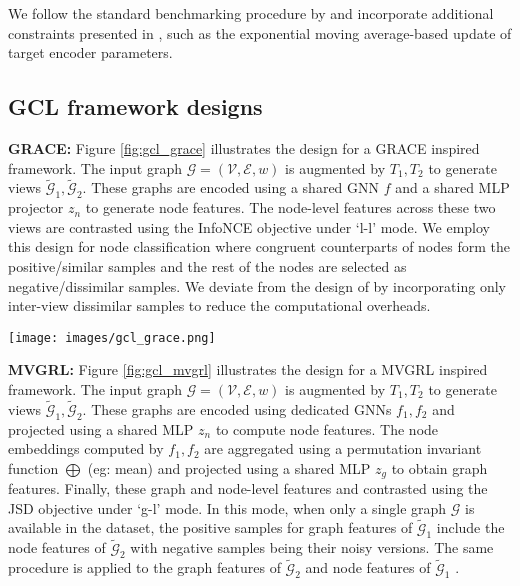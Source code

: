 \documentclass{article}
\def\gE{{\mathcal{E}}}
\def\gG{{\mathcal{G}}}
\def\gV{{\mathcal{V}}}
\theoremstyle{plain}
\theoremstyle{definition}
\theoremstyle{remark}
\begin{document}
We follow the standard benchmarking procedure by \citet{zhu2021empirical} and incorporate additional constraints presented in  \citet{thakoor2021bootstrapped}, such as the exponential moving average-based update of target encoder parameters.

\subsection{GCL framework designs}

\textbf{GRACE:} Figure \ref{fig:gcl_grace} illustrates the design for a GRACE \citep{zhu2020deep} inspired framework. The input graph $\gG=(\gV, \gE, w)$ is augmented by $T_1, T_2$ to generate views $\widetilde{\gG}_1, \widetilde{\gG}_2$. These graphs are encoded using a shared GNN $f$ and a shared MLP projector $z_n$ to generate node features. The node-level features across these two views are contrasted using the InfoNCE objective under `l-l' mode. We employ this design for node classification where congruent counterparts of nodes form the positive/similar samples and the rest of the nodes are selected as negative/dissimilar samples. We deviate from the design of \citet{zhu2020deep} by incorporating only inter-view dissimilar samples to reduce the computational overheads.

\begin{figure*}[ht]
\vskip 0.2in
\begin{center}
\centerline{\texttt{[image: images/gcl\_grace.png]}}
\caption{GRACE design with shared encoder $f$, shared node feature projector $z_n$, l-l contrastive mode and InfoNCE objective.} 
\label{fig:gcl_grace}
\end{center}
\vskip -0.2in
\end{figure*}

\textbf{MVGRL:} Figure \ref{fig:gcl_mvgrl} illustrates the design for a MVGRL \citep{hassani2020contrastive} inspired framework. The input graph $\gG=(\gV, \gE, w)$ is augmented by $T_1, T_2$ to generate views $\widetilde{\gG}_1, \widetilde{\gG}_2$. These graphs are encoded using dedicated GNNs $f_1, f_2$ and projected using a shared MLP $z_n$ to compute node features. The node embeddings computed by $f_1, f_2$ are aggregated using a permutation invariant function $\bigoplus$ (eg: mean) and projected using a shared MLP $z_g$ to obtain graph features. Finally, these graph and node-level features and contrasted using the JSD objective under `g-l' mode. In this mode, when only a single graph $\gG$ is available in the dataset, the positive samples for graph features of $\widetilde{\gG}_1$ include the node features of $\widetilde{\gG}_2$ with negative samples being their noisy versions. The same procedure is applied to the graph features of $\widetilde{\gG}_2$ and node features of $\widetilde{\gG}_1$ \citep{velickovic2019deep, hassani2020contrastive, zhu2021empirical}.
\end{document}
